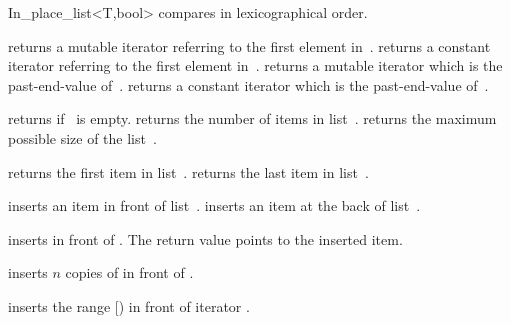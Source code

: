 \begin{ccClassTemplate}{In_place_list<T,bool>}
       {compares in lexicographical order.}



\def\ccTagRmTrailingConst{\ccFalse}
       {returns a mutable iterator referring to the first element in~\ccVar.}
\ccGlue
{}
       {returns a constant iterator referring to the first element in~\ccVar.}
\ccGlue
{}
       {returns a mutable iterator which is the past-end-value of~\ccVar.}
\ccGlue
{}
       {returns a constant iterator which is the past-end-value of~\ccVar.}
\def\ccTagRmTrailingConst{\ccTrue}

       {returns  if \ccVar\ is empty.}
\ccGlue
{}
       {returns the number of items in list~\ccVar.}
\ccGlue
{}
       {returns the maximum possible size of the list~\ccVar.}

       {returns the first item in list~\ccVar.}
\ccGlue
{}
       {returns the last item in list~\ccVar.}

\ccHidden{}
\ccHidden{}



       {inserts an item in front of list~\ccVar.}
\ccGlue
{}
       {inserts an item at the back of list~\ccVar.}

\ccGlue
{}
 {inserts   in front of .
  The return value points to the inserted item.}

\ccGlue
{}
 {inserts $n$ copies of  in front of .}



 {inserts the range [) in front of iterator
   .}


\end{ccClassTemplate}
